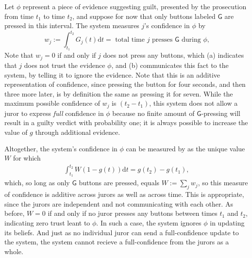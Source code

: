 \begin{example}
Let $\phi$ represent a piece of evidence suggesting guilt, presented by the
prosecution from time $t_1$ to time $t_2$,
and suppose for now that only buttons labeled $\mathsf G$ are pressed
in this interval.
%
The system measures $j$'s confidence in $\phi$ by
\[
	w_j := \!\int_{t_1}^{t_2}\!\! G_j(t) \mathrm d t 
	= \text{ total time $j$ presses $\mathsf G$ during $\phi$,}
\]
Note that $w_j = 0$ if and only if $j$ does not press any buttons,
which (a) indicates that $j$ does not trust the evidence $\phi$, 
and (b) communicates this fact to the system, by telling it to ignore 
the evidence. 
Note that this is an additive representation of confidence, since
pressing the button for four seconds, and then three more later, is
by definition the same as pressing it for seven. 
While the maximum possible confidence of $w_j$ is $(t_2 - t_1)$,
this system does not allow a juror to express \emph{full} confidence in $\phi$
because no finite amount of $\mathsf G$-pressing will result in a 
guilty verdict with probability one; it is always possible to increase
the value of $g$ through additional evidence. 

Altogether, the system's confidence in $\phi$ can be measured by
as the unique value $W$ for which
\begin{align*}
	\int_{t_1}^{t_2} W (1-g(t)) \mathrm d t =
	 g(t_2) - g(t_1),
\end{align*}
which, so long as only $\mathsf G$ buttons are pressed, equals
$W := \sum_{j} w_j$, so this measure of confidence is additive 
across jurors as well as across time. 
This is appropriate, since the jurors are independent and 
not communicating with each other.
As before, $W = 0$ if and only if no juror presses any buttons between times $t_1$ and $t_2$,
indicating zero trust leant to $\phi$. In such a case, the system ignores $\phi$ in updating its beliefs.
And just as no individual juror can send a full-confidence update to the system,
	the system cannot recieve a full-confidence from the jurors as a whole.
	

\end{example}
